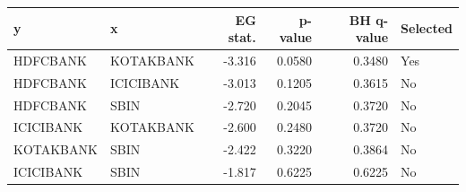 \begin{tabular}{llrrrl}
\toprule
y & x & EG stat. & p-value & BH q-value & Selected\\
\midrule
HDFCBANK & KOTAKBANK & -3.316 & 0.0580 & 0.3480 & Yes\\
HDFCBANK & ICICIBANK & -3.013 & 0.1205 & 0.3615 & No\\
HDFCBANK & SBIN & -2.720 & 0.2045 & 0.3720 & No\\
ICICIBANK & KOTAKBANK & -2.600 & 0.2480 & 0.3720 & No\\
KOTAKBANK & SBIN & -2.422 & 0.3220 & 0.3864 & No\\
ICICIBANK & SBIN & -1.817 & 0.6225 & 0.6225 & No\\
\bottomrule
\end{tabular}
